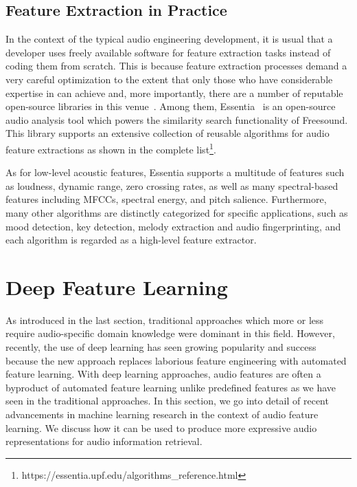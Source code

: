 \subsection{Feature Extraction in Practice}
In the context of the typical audio engineering development, it is usual that a developer uses freely available software for feature extraction tasks instead of coding them from scratch. This is because feature extraction processes demand a very careful optimization to the extent that only those who have considerable expertise in can achieve and, more importantly, there are a number of reputable open-source libraries in this venue~\cite{mcfee2015, giannakopoulos2015, bullock2007}. Among them, Essentia~\cite{bogdanov2013} is an open-source audio analysis tool which powers the similarity search functionality of Freesound. This library supports an extensive collection of reusable algorithms for audio feature extractions as shown in the complete list\footnote{https://essentia.upf.edu/algorithms\_reference.html}. 

As for low-level acoustic features, Essentia supports a multitude of features such as loudness, dynamic range, zero crossing rates, as well as many spectral-based features including MFCCs, spectral energy, and pitch salience. Furthermore, many other algorithms are distinctly categorized for specific applications, such as mood detection, key detection, melody extraction and audio fingerprinting, and each algorithm is regarded as a high-level feature extractor.

\section{Deep Feature Learning}

As introduced in the last section, traditional approaches which more or less require audio-specific domain knowledge were dominant in this field. However, recently, the use of deep learning has seen growing popularity and success because the new approach replaces laborious feature engineering with automated feature learning.
With deep learning approaches, audio features are often a byproduct of automated feature learning unlike predefined features as we have seen in the traditional approaches.  In this section, we go into detail of recent advancements in machine learning research in the context of audio feature learning. We discuss how it can be used to produce more expressive audio representations for audio information retrieval.

